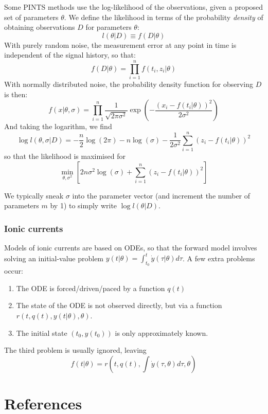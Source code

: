\documentclass[preprint,authoryear,12pt]{elsarticle}
\begin{document}
Some PINTS methods use the log-likelihood of the observations, given a proposed
 set of parameters $\theta$.
We define the likelihood in terms of the probability \emph{density} of
 obtaining observations $D$ for parameters $\theta$:
\begin{equation}
l(\theta|D) \equiv f(D|\theta)
\end{equation}
With purely random noise, the measurement error at any point in time is
 independent of the signal history, so that:
\begin{equation}
f(D|\theta) = \prod_{i=1}^{n} f(t_i,z_i|\theta)
\end{equation}
With normally distributed noise, the probability density function for
 observing $D$ is then:
\begin{equation}
f(x|\theta,\sigma) = \prod_{i=1}^{n} \frac{1}{\sqrt{2\pi\sigma^2}}
    \exp \left(
        -\frac{\left(x_i - f(t_i|\theta)\right)^2}{2\sigma^2}
    \right)
\end{equation}
And taking the logarithm, we find
\begin{equation}
\log l(\theta,\sigma|D) =
    - \frac{n}{2} \log(2\pi)
    - n \log(\sigma)
    - \frac{1}{2\sigma^2} \sum_{i=1}^n \left(z_i - f(t_i|\theta) \right)^2
\end{equation}
so that the likelihood is maximised for
\begin{equation}
\min_{ \theta, \sigma^2 }
    \left[
        2n\sigma^2 \log(\sigma)
        + \sum_{i=1}^n \left(z_i - f(t_i|\theta) \right)^2
    \right]
\end{equation}

We typically sneak $\sigma$ into the parameter vector (and increment the
 number of parameters $m$ by 1) to simply write $\log l(\theta|D)$.
 

\subsubsection{Ionic currents}

Models of ionic currents are based on ODEs, so that the forward model involves
 solving an initial-value problem
 $y(t|\theta) = \int_{t_0}^t \dot{y}(\tau|\theta)d\tau$.
A few extra problems occur:
\begin{enumerate}
\item The ODE is forced/driven/paced by a function $q(t)$
\item The state of the ODE is not observed directly, but via a function
 $r(t, q(t), y(t|\theta), \theta)$.
\item The initial state $(t_0, y(t_0))$ is only approximately known.
\end{enumerate}
The third problem is usually ignored, leaving
\begin{equation}
f(t|\theta) = r(t, q(t), \int\dot{y}(\tau, \theta)d\tau, \theta)
\end{equation}






%
%
%
%
\section*{References}



\end{document}
